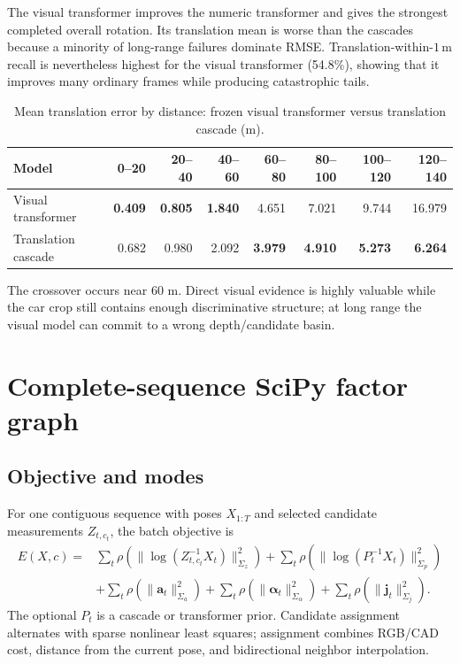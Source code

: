 \documentclass[11pt]{article}
\newcommand{\best}[1]{\textbf{#1}}
\newcommand{\unitm}{\,\mathrm{m}}
\begin{document}
The visual transformer improves the numeric transformer and gives the strongest completed overall rotation.  Its translation mean is worse than the cascades because a minority of long-range failures dominate RMSE.  Translation-within-$1\unitm$ recall is nevertheless highest for the visual transformer (54.8\%), showing that it improves many ordinary frames while producing catastrophic tails.

\begin{table}[H]
\centering
\caption{Mean translation error by distance: frozen visual transformer versus translation cascade (m).}
\begin{tabular}{lrrrrrrr}
\toprule
Model & 0--20 & 20--40 & 40--60 & 60--80 & 80--100 & 100--120 & 120--140\\
\midrule
Visual transformer & \best{0.409} & \best{0.805} & \best{1.840} & 4.651 & 7.021 & 9.744 & 16.979\\
Translation cascade & 0.682 & 0.980 & 2.092 & \best{3.979} & \best{4.910} & \best{5.273} & \best{6.264}\\
\bottomrule
\end{tabular}
\end{table}

The crossover occurs near 60 m.  Direct visual evidence is highly valuable while the car crop still contains enough discriminative structure; at long range the visual model can commit to a wrong depth/candidate basin.

\clearpage
\section{Complete-sequence SciPy factor graph}

\subsection{Objective and modes}

For one contiguous sequence with poses $X_{1:T}$ and selected candidate measurements $Z_{t,c_t}$, the batch objective is
\begin{align}
E(X,c)=&\sum_t \rho\!\left(\|\log(Z_{t,c_t}^{-1}X_t)\|_{\Sigma_z}^2\right)
+\sum_t\rho\!\left(\|\log(P_t^{-1}X_t)\|_{\Sigma_p}^2\right)\\
&+\sum_t\rho\!\left(\|\bm a_t\|_{\Sigma_a}^2\right)
+\sum_t\rho\!\left(\|\bm\alpha_t\|_{\Sigma_\alpha}^2\right)
+\sum_t\rho\!\left(\|\bm j_t\|_{\Sigma_j}^2\right).
\end{align}
The optional $P_t$ is a cascade or transformer prior.  Candidate assignment alternates with sparse nonlinear least squares; assignment combines RGB/CAD cost, distance from the current pose, and bidirectional neighbor interpolation.
\end{document}
